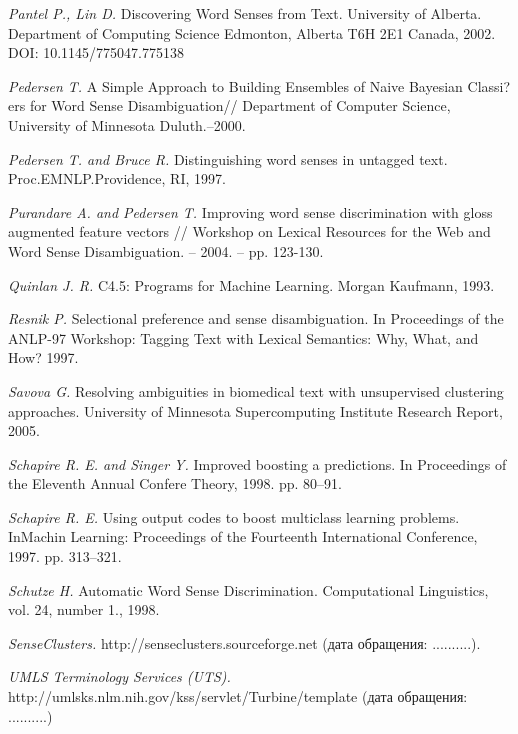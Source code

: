 \documentclass{article}
\begin{document}
\begin{articletext}
\begin{thebibliography}{9}
\textit{Pantel P.,  Lin D. }Discovering Word Senses from Text. University of Alberta. Department of Computing Science Edmonton, Alberta T6H 2E1 Canada, 2002. DOI: 10.1145/775047.775138

\textit{Pedersen T. }A Simple Approach to Building Ensembles of Naive Bayesian Classi?ers for Word Sense Disambiguation// Department of Computer Science, University of Minnesota Duluth.–2000.

\textit{Pedersen T. and  Bruce R. }Distinguishing word senses in untagged text. Proc.EMNLP.Providence, RI, 1997.

\textit{ Purandare A. and  Pedersen T. }Improving word sense discrimination with gloss augmented feature vectors // Workshop on Lexical Resources for the Web and Word Sense Disambiguation. – 2004. – pp. 123-130. 

\textit{Quinlan J. R. }C4.5: Programs for Machine Learning. Morgan Kaufmann, 1993. 

\textit{Resnik P. }Selectional preference and sense disambiguation. In Proceedings of the ANLP-97 Workshop: Tagging Text with Lexical Semantics: Why, What, and How? 1997.

\textit{Savova G. }Resolving ambiguities in biomedical text with unsupervised clustering approaches. University of Minnesota Supercomputing Institute Research Report, 2005.

\textit{Schapire R. E. and Singer Y. }Improved boosting a predictions. In Proceedings of the Eleventh Annual Confere Theory, 1998. pp. 80–91. 

\textit{Schapire R. E. }Using output codes to boost multiclass learning problems. InMachin Learning: Proceedings of the Fourteenth International Conference, 1997. pp. 313–321. 

\textit{Schutze H. }Automatic Word Sense Discrimination. Computational Linguistics, vol. 24, number 1., 1998.

\textit{SenseClusters. }  \newline http://senseclusters.sourceforge.net (дата обращения: ..........).

\textit{UMLS Terminology Services (UTS).} http://umlsks.nlm.nih.gov/kss/servlet/Turbine/\newline template (дата обращения: ..........)


\end{thebibliography}
\end{articletext}
\end{document}
